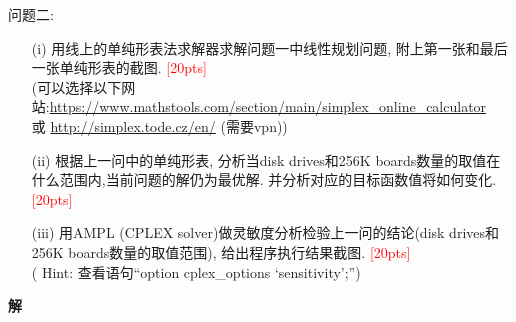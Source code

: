 \documentclass[10pt]{article}
\begin{document}
{\color{blue}问题二: 
	\begin{itemize}
		\item[(i)] 用线上的单纯形表法求解器求解问题一中线性规划问题, 附上第一张和最后一张单纯形表的截图. \textcolor{red}{[20pts]}\\
		(可以选择以下网站:\url{https://www.mathstools.com/section/main/simplex_online_calculator}\\
		或 \url{http://simplex.tode.cz/en/} (需要vpn)) 
		\item[(ii)] 根据上一问中的单纯形表, 分析当disk drives和256K boards数量的取值在什么范围内,当前问题的解仍为最优解. 并分析对应的目标函数值将如何变化. \textcolor{red}{[20pts]}
		\item[(iii)] 用AMPL (CPLEX solver)做灵敏度分析检验上一问的结论(disk drives和256K boards数量的取值范围), 给出程序执行结果截图. \textcolor{red}{[20pts]}\\
					( Hint: 查看语句``option cplex\_options `sensitivity';'')
	\end{itemize}
}
\textbf{解}\\
\end{document}
